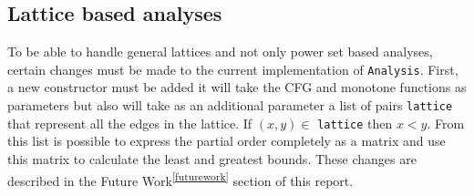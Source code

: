 \subsection{Lattice based analyses}
To be able to handle general lattices and not only power set based analyses, certain changes must be made to the current implementation of \texttt{Analysis}. First, a new constructor must be added it will take the CFG and monotone functions as parameters but also will take as an additional parameter a list of pairs \texttt{lattice} that represent all the edges in the lattice. If $(x,y) \in$ \texttt{lattice} then $x < y$. From this list is possible to express the partial order completely as a matrix and use this matrix to calculate the least and greatest bounds. These changes are described in the Future Work\textsuperscript{\ref{futurework}} section of this report. 


